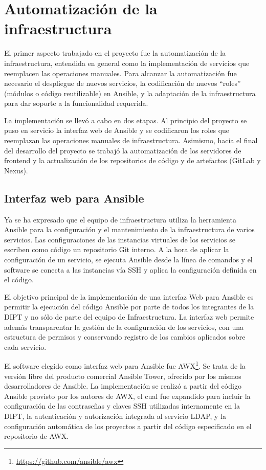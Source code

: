 %
%
%
\chapter{Automatización de la infraestructura}
%
El primer aspecto trabajado en el proyecto fue la automatización de la
infraestructura, entendida en general como la implementación de
servicios que reemplacen las operaciones manuales. Para alcanzar la
automatización fue necesario el despliegue de nuevos servicios, la
codificación de nuevos ``roles'' (módulos o código reutilizable) en
Ansible, y la adaptación de la infraestructura para dar soporte a la
funcionalidad requerida.

La implementación se llevó a cabo en dos etapas. Al principio del
proyecto se puso en servicio la interfaz web de Ansible y se
codificaron los roles que reemplazan las operaciones manuales de
infraestructura. Asimismo, hacia el final del desarrollo del proyecto
se trabajó la automatización de los servidores de frontend y la
actualización de los repositorios de código y de artefactos (GitLab y
Nexus).
%
%
\section{Interfaz web para Ansible}
%
Ya se ha expresado que el equipo de infraestructura utiliza la
herramienta Ansible para la configuración y el mantenimiento de la
infraestructura de varios servicios. Las configuraciones de las
instancias virtuales de los servicios se escriben como código un
repositorio Git interno. A la hora de aplicar la configuración de un
servicio, se ejecuta Ansible desde la línea de comandos y el software
se conecta a las instancias vía SSH y aplica la configuración definida
en el código.

El objetivo principal de la implementación de una interfaz Web para
Ansible es permitir la ejecución del código Ansible por parte de todos
los integrantes de la DIPT y no sólo de parte del equipo de
Infraestructura. La interfaz web permite además transparentar la
gestión de la configuración de los servicios, con una estructura de
permisos y conservando registro de los cambios aplicados sobre cada
servicio.

El software elegido como interfaz web para Ansible fue AWX\footnote{
  \url{https://github.com/ansible/awx}}. Se trata de la versión libre
del producto comercial Ansible Tower, ofrecido por los mismos
desarrolladores de Ansible. La implementación se realizó a partir del
código Ansible provisto por los autores de AWX, el cual fue expandido
para incluir la configuración de las contraseñas y claves SSH
utilizadas internamente en la DIPT, la autenticación y autorización
integrada al servicio LDAP, y la configuración automática de los
proyectos a partir del código especificado en el repositorio de AWX.

